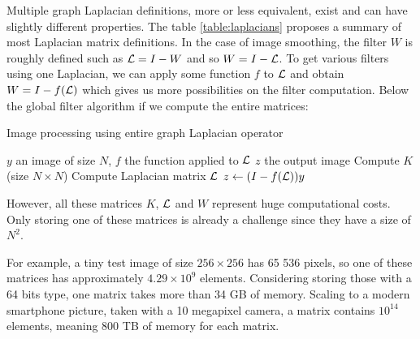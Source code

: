 Multiple graph Laplacian definitions, more or less equivalent, exist and can have slightly different properties.
\ifthesis
The table \ref{table:laplacians} proposes a summary of most Laplacian matrix definitions.
\fi
In the case of image smoothing, the filter \(W\) is roughly defined such as \(\operatorname{\mathcal{L}} = I - W\) \cite{siam_slides_2016} and so \(W = I - \operatorname{\mathcal{L}}\).
To get various filters using one Laplacian, we can apply some function \(f\) to \(\operatorname{\mathcal{L}}\) and obtain \(W = I - f(\operatorname{\mathcal{L}})\) which gives us more possibilities on the filter computation.
\ifthesis
 Below the global filter algorithm if we compute the entire matrices:

 \begin{algorithm}[H]
  \caption{Image processing using entire graph Laplacian operator}
  \begin{algorithmic}
   \REQUIRE \(y\) an image of size \(N\), \(f\) the function applied to \(\operatorname{\mathcal{L}}\)
   \ENSURE \(z\) the output image
   \STATE Compute \(K\) (size \(N \times N\))
   \STATE Compute Laplacian matrix \(\operatorname{\mathcal{L}}\)
   \STATE \(z \leftarrow (I - f(\operatorname{\mathcal{L}})) y\)
  \end{algorithmic}
 \end{algorithm}
\fi

However, all these matrices \(K\), \(\operatorname{\mathcal{L}}\) and \(W\) represent huge computational costs.
Only storing one of these matrices is already a challenge since they have a size of \(N^2\).

For example, a tiny test image of size \(256 \times 256\) has 65 536 pixels, so one of these matrices has approximately \(4.29 \times 10^9\) elements.
Considering storing those with a 64 bits type, one matrix takes more than 34 GB of memory.
Scaling to a modern smartphone picture, taken with a 10 megapixel camera, a matrix contains \(10^{14}\) elements, meaning 800 TB of memory for each matrix.
